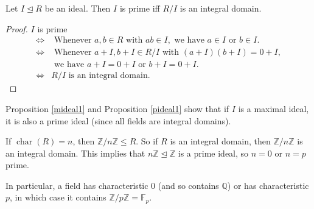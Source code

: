 \documentclass[egregdoesnotlikesansseriftitles,a4paper]{scrartcl}
\begin{document}
\begin{proposition}\label{pideal1}
       Let $I \unlhd R$ be an ideal. Then $I$ is prime iff $R/I$ is an integral domain.
       \begin{proof}
            $I$ is prime
            \begin{align*}
                 \iff & \text{ Whenever } a,b \in R \text{ with } ab \in I, \text{ we have } a \in I \text{ or } b \in I. \\
                 \iff & \text{ Whenever } a+I,b+I \in R/I \text{ with } (a+I)(b+I)=0+I,\\& \text{ we have } a+I=0+I \text{ or } b+I=0+I.\\
                 \iff & R/I \text{ is an integral domain.} 
            \end{align*}
     \end{proof}
\end{proposition}
\begin{remark}
       Proposition \ref{mideal1} and Proposition \ref{pideal1} show that if $I$ is a maximal ideal, it is also a prime ideal (since all fields are integral domains).
\end{remark}
\begin{remark}
       If $\operatorname{char}(R)=n$, then $\mathbb{Z}/n\mathbb{Z} \leq R$. So if $R$ is an integral domain, then $\mathbb{Z}/n\mathbb{Z}$ is an integral domain. This implies that $n\mathbb{Z} \unlhd \mathbb{Z}$ is a prime ideal, so $n=0$ or $n=p$ prime.

       In particular, a field has characteristic 0 (and so contains $\mathbb{Q}$) or has characteristic $p$, in which case it contains $\mathbb{Z}/p\mathbb{Z}=\mathbb{F}_{p}$.
\end{remark}
\end{document}
